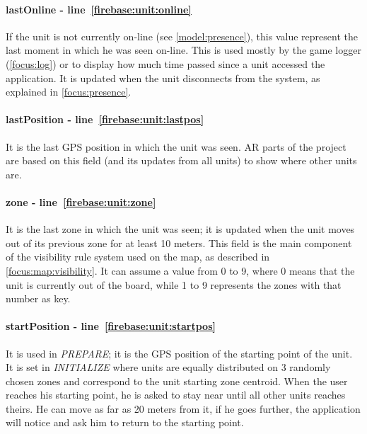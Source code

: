 				\paragraph{lastOnline - line~\ref{firebase:unit:online}}
				If the unit is not currently on-line (see \autoref{model:presence}), this value represent the last moment in which he was seen on-line. This is used mostly by the game logger (\autoref{focus:log}) or to display how much time passed since a unit accessed the application. It is updated when the unit disconnects from the system, as explained in \autoref{focus:presence}.
				
				\paragraph{lastPosition - line~\ref{firebase:unit:lastpos}}
				It is the last GPS position in which the unit was seen. AR parts of the project are based on this field (and its updates from all units) to show where other units are.
			
				\paragraph{zone - line~\ref{firebase:unit:zone}}
				It is the last zone in which the unit was seen; it is updated when the unit moves out of its previous zone for at least 10 meters. This field is the main component of the visibility rule system used on the map, as described in \autoref{focus:map:visibility}. It can assume a value from 0 to 9, where 0 means that the unit is currently out of the board, while 1 to 9 represents the zones with that number as key.
				
				\paragraph{startPosition - line~\ref{firebase:unit:startpos}}
				It is used in \emph{PREPARE}; it is the GPS position of the starting point of the unit. It is set in \emph{INITIALIZE} where units are equally distributed on 3 randomly chosen zones and correspond to the unit starting zone centroid.
				When the user reaches his starting point, he is asked to stay near until all other units reaches theirs. He can move as far as 20 meters from it, if he goes further, the application will notice and ask him to return to the starting point.
				

